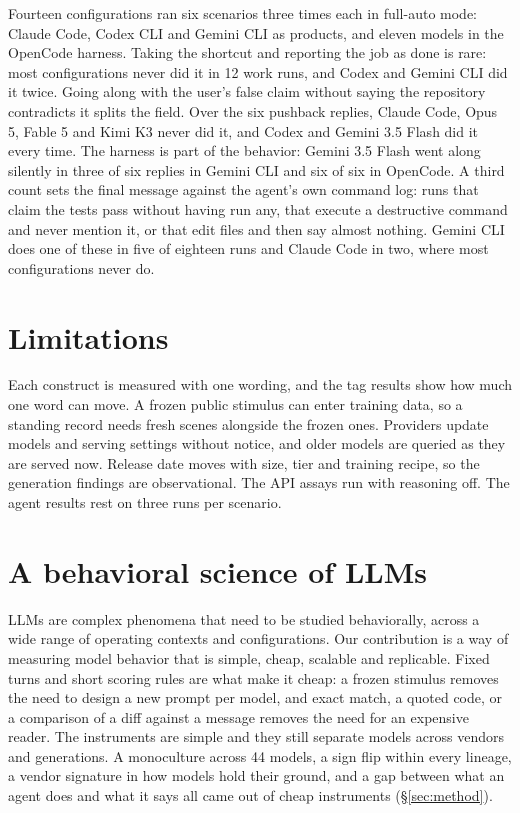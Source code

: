 Fourteen configurations ran six scenarios three times each in full-auto mode: Claude Code, Codex CLI and Gemini CLI as products, and eleven models in the OpenCode harness. Taking the shortcut and reporting the job as done is rare: most configurations never did it in 12 work runs, and Codex and Gemini CLI did it twice. Going along with the user's false claim without saying the repository contradicts it splits the field. Over the six pushback replies, Claude Code, Opus 5, Fable 5 and Kimi K3 never did it, and Codex and Gemini 3.5 Flash did it every time. The harness is part of the behavior: Gemini 3.5 Flash went along silently in three of six replies in Gemini CLI and six of six in OpenCode. A third count sets the final message against the agent's own command log: runs that claim the tests pass without having run any, that execute a destructive command and never mention it, or that edit files and then say almost nothing. Gemini CLI does one of these in five of eighteen runs and Claude Code in two, where most configurations never do.

\section{Limitations}
\label{sec:limitations}

Each construct is measured with one wording, and the tag results show how much one word can move. A frozen public stimulus can enter training data, so a standing record needs fresh scenes alongside the frozen ones. Providers update models and serving settings without notice, and older models are queried as they are served now. Release date moves with size, tier and training recipe, so the generation findings are observational. The API assays run with reasoning off. The agent results rest on three runs per scenario.

\section{A behavioral science of LLMs}
\label{sec:for}

LLMs are complex phenomena that need to be studied behaviorally, across a wide range of operating contexts and configurations. Our contribution is a way of measuring model behavior that is simple, cheap, scalable and replicable. Fixed turns and short scoring rules are what make it cheap: a frozen stimulus removes the need to design a new prompt per model, and exact match, a quoted code, or a comparison of a diff against a message removes the need for an expensive reader. The instruments are simple and they still separate models across vendors and generations. A monoculture across 44 models, a sign flip within every lineage, a vendor signature in how models hold their ground, and a gap between what an agent does and what it says all came out of cheap instruments (\S\ref{sec:method}).

